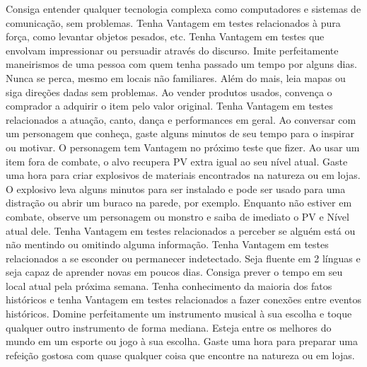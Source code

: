 \vfill
{}
{
	Consiga entender qualquer tecnologia complexa como computadores e sistemas de comunicação, sem problemas.
}
\vfill
{}
{
	Tenha Vantagem em testes relacionados à pura força, como levantar objetos pesados, etc.
}
\vfill
{}
{
	Tenha Vantagem em testes que envolvam impressionar ou persuadir através do discurso.
}
\vfill
{}
{
	Imite perfeitamente maneirismos de uma pessoa com quem tenha passado um tempo por alguns dias. 
}
\vfill
{}
{
	Nunca se perca, mesmo em locais não familiares. 
	Além do mais, leia mapas ou siga direções dadas sem problemas. 
}
\vfill
{}
{
	Ao vender produtos usados, convença o comprador a adquirir o item pelo valor original.
}
\vfill
{}
{
	Tenha Vantagem em testes relacionados a atuação, canto, dança e performances em geral.
}
\vfill
{}
{
	Ao conversar com um personagem que conheça, gaste alguns minutos de seu tempo para o inspirar ou motivar.
	O personagem tem Vantagem no próximo teste que fizer.
}
\vfill
{}
{
	Ao usar um item fora de combate, o alvo recupera PV extra igual ao seu nível atual.
}
\vfill
{} 
{
	Gaste uma hora para criar explosivos de materiais encontrados na natureza ou em lojas. 
	O explosivo leva alguns minutos para ser instalado e pode ser usado para uma distração ou abrir um buraco na parede, por exemplo.
}
\vfill
{}
{
	Enquanto não estiver em combate, observe um personagem ou monstro e saiba de imediato o PV e Nível atual dele.
}
\vfill
{}
{
	Tenha Vantagem em testes relacionados a perceber se alguém está ou não mentindo ou omitindo alguma informação.
}
%
\newpage
%
{
	Tenha Vantagem em testes relacionados a se esconder ou permanecer indetectado.
}
\vfill
{}
{
	Seja fluente em 2 línguas e seja capaz de aprender novas em poucos dias. 
}
\vfill
{}
{
	Consiga prever o tempo em seu local atual pela próxima semana. 
}
\vfill
{}
{
	Tenha conhecimento da maioria dos fatos históricos e tenha Vantagem em testes relacionados a fazer conexões entre eventos históricos.
}
\vfill
{}
{
	Domine perfeitamente um instrumento musical à sua escolha e toque qualquer outro instrumento de forma mediana.
}
\vfill
{}
{
	Esteja entre os melhores do mundo em um esporte ou jogo à sua escolha.
}
\vfill
{}
{
	Gaste uma hora para preparar uma refeição gostosa com quase qualquer coisa que encontre na natureza ou em lojas.
}
